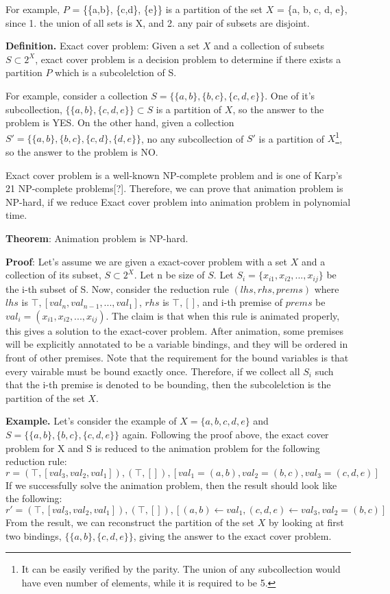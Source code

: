 For example, $P$ = \{\{a,b\}, \{c,d\}, \{e\}\} is a partition of the set $X$ = \{a, b, c, d, e\},
since 1. the union of all sets is X, and 2. any pair of subsets are disjoint.

\textbf{Definition.} Exact cover problem: Given a set $X$ and a collection of subsets $S \subset 2^X$,
exact cover problem is a decision problem to determine if there exists a partition $P$ which is a
subcolelction of S.

For example, consider a collection $S = \{\{a,b\}, \{b,c\}, \{c,d,e\}\}$.
One of it's subcollection, $\{\{a,b\}, \{c,d,e\}\} \subset S$ is a partition of $X$,
so the answer to the problem is YES.
On the other hand, given a collection $S' = \{\{a,b\}, \{b,c\}, \{c,d\}, \{d,e\}\}$,
no any subcollection of $S'$ is a partition of $X$\footnote{It can be easily
verified by the parity. The union of any subcollection would have even number
of elements, while it is required to be 5.}, so the answer to the problem is
NO.

Exact cover problem is a well-known NP-complete problem and is one of Karp's 21 NP-complete problems[?].
Therefore, we can prove that animation problem is NP-hard, if we reduce Exact cover problem
into animation problem in polynomial time.

\textbf{Theorem}: Animation problem is NP-hard.

\textbf{Proof}: Let's assume we are given a exact-cover problem with a set $X$ and a
collection of its subset, $S \subset 2^X$. Let n be size of $S$.
Let $S_i = \{x_{i1}, x_{i2}, ..., x_{ij}\}$ be the i-th subset of S.
Now, consider the reduction rule $(lhs, rhs, prems)$ where
$lhs$ is $\top, [val_n, val_{n-1}, ..., val_1]$,
$rhs$ is $\top, []$, and
i-th premise of $prems$ be $val_i = (x_{i1}, x_{i2}, ..., x_{ij})$.
The claim is that when this rule is animated properly, this gives a solution to the exact-cover problem.
After animation, some premises will be explicitly annotated to be a variable bindings,
and they will be ordered in front of other premises. Note that the requirement for the
bound variables is that every vairable must be bound exactly once. Therefore, if we collect
all $S_i$ such that the i-th premise is denoted to be bounding, then the subcolelction is
the partition of the set $X$.

\textbf{Example.}
Let's consider the example of $X = \{a, b, c, d, e\}$ and $S = \{\{a,b\}, \{b,c\}, \{c,d,e\}\}$ again.
Following the proof above, the exact cover problem for X and S is reduced to the animation problem for the
following reduction rule:
\[r = (\top, [val_3, val_2, val_1]), (\top, []), [val_1 = (a,b), val_2 = (b,c), val_3 = (c, d, e)]\]
If we successfully solve the animation problem, then the result should look like the following:
\[r' = (\top, [val_3, val_2, val_1]), (\top, []), [(a,b) \leftarrow val_1, (c, d, e) \leftarrow val_3, val_2 = (b,c)]\]
From the result, we can reconstruct the partition of the set $X$ by looking at first two bindings,
$\{\{a, b\}, \{c, d, e\}\}$, giving the answer to the exact cover problem.

